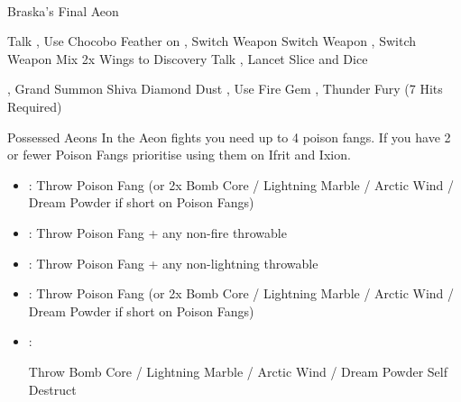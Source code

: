 \vfill\ \colbreak
\begin{battle}[180000]{Braska's Final Aeon}
	\begin{itemize}
		\tidusf Talk
		\switch{\yuna}{\rikku}, Use Chocobo Feather on \tidus
		\switch{\auron}{\yuna}, Switch Weapon
		\rikkuf Switch Weapon
		\switch{\yuna}{\lulu}, Switch Weapon
		\rikkuf Mix 2x Wings to Discovery
		\tidusf Talk
		\switch{\lulu}{\kimahri}, Lancet
		\tidusf Slice and Dice
		
		\vspace{\baselineskip}

		\switch{\rikku}{\yuna}, Grand Summon Shiva
		\shivaf Diamond Dust
		\switch{\kimahri}{\rikku}, Use Fire Gem
		\switch{\tidus}{\lulu}, Thunder Fury (7 Hits Required)
	\end{itemize}
\end{battle}
\colend
{}
\begin{battle}{Possessed  Aeons}
	In the Aeon fights you need up to 4 poison fangs. If you have 2 or fewer Poison Fangs prioritise using them on Ifrit and Ixion.
	\begin{itemize}
		\item \valefor : Throw Poison Fang (or 2x Bomb Core / Lightning Marble / Arctic Wind / Dream Powder if short on Poison Fangs)
		\item \ifrit : Throw Poison Fang + any non-fire throwable
		\item \ixilon : Throw Poison Fang + any non-lightning throwable
		\item \shiva : Throw Poison Fang (or 2x Bomb Core / Lightning Marble / Arctic Wind / Dream Powder if short on Poison Fangs)
		\item \bahamut :
			\begin{itemize}
				\rikkuf Throw Bomb Core / Lightning Marble / Arctic Wind / Dream Powder
				\switch{\yuna}{\kimahri}
				\kimahrif Self Destruct
			\end{itemize}
	\end{itemize}
\end{battle}
